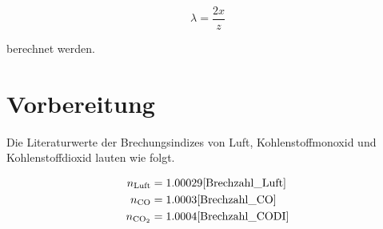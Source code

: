 \begin{equation}
\label{eqn:Laenge}
    \lambda = \frac{2x}{z}
\end{equation}

\noindent berechnet werden.

\section{Vorbereitung}

Die Literaturwerte der Brechungsindizes von Luft, Kohlenstoffmonoxid und Kohlenstoffdioxid lauten wie folgt.

\begin{align}
    n_\text{Luft} &= 1.00029\text{\cite{Brechzahl_Luft}}\\ 
    n_\text{CO} &= 1.0003\text{\cite{Brechzahl_CO}}\\ 
    n_\text{CO$_2$} &= 1.0004\text{\cite{Brechzahl_CODI}}\\
\end{align}

